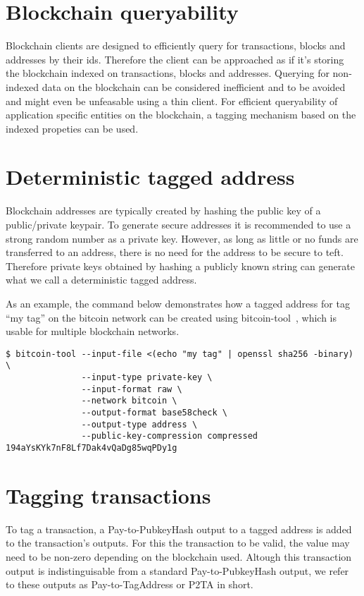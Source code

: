 \documentclass[a4paper,10pt]{article}
\begin{document}
\section{Blockchain queryability}
Blockchain clients are designed to efficiently query for transactions, blocks and addresses by their ids.
Therefore the client can be approached as if it's storing the blockchain indexed on transactions, blocks and addresses.
Querying for non-indexed data on the blockchain can be considered inefficient and to be avoided and might even be unfeasable using a thin client.
For efficient queryability of application specific entities on the blockchain, a tagging mechanism based on the indexed propeties can be used.

\section{Deterministic tagged address}
\label{sec:taggedaddress}
Blockchain addresses are typically created by hashing the public key of a public/private keypair.
To generate secure addresses it is recommended to use a strong random number as a private key.
However, as long as little or no funds are transferred to an address, there is no need for the address to be secure to teft.
Therefore private keys obtained by hashing a publicly known string can generate what we call a deterministic tagged address.

As an example, the command below demonstrates how a tagged address for tag ``my tag'' on the bitcoin network can be created using bitcoin-tool~\cite{Matja}, which is usable for multiple blockchain networks.
\begin{verbatim}
$ bitcoin-tool --input-file <(echo "my tag" | openssl sha256 -binary) \
               --input-type private-key \
               --input-format raw \
               --network bitcoin \
               --output-format base58check \
               --output-type address \
               --public-key-compression compressed
194aYsKYk7nF8Lf7Dak4vQaDg85wqPDy1g
\end{verbatim}

\section{Tagging transactions}
To tag a transaction, a Pay-to-PubkeyHash output to a tagged address is added to the transaction's outputs.
For this the transaction to be valid, the value may need to be non-zero depending on the blockchain used.
Altough this transaction output is indistinguisable from a standard Pay-to-PubkeyHash output, we refer to these outputs as Pay-to-TagAddress or P2TA in short.
\end{document}
